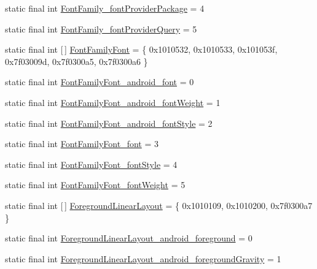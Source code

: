 \begin{DoxyCompactItemize}
static final int \mbox{\hyperlink{classandroid_1_1support_1_1design_1_1_r_1_1styleable_a5e5338b1eec839ae92c950a037b00a0d}{Font\+Family\+\_\+font\+Provider\+Package}} = 4
\item 
static final int \mbox{\hyperlink{classandroid_1_1support_1_1design_1_1_r_1_1styleable_ae5bf61893247cd75d621dc7bb25fecb1}{Font\+Family\+\_\+font\+Provider\+Query}} = 5
\item 
static final int \mbox{[}$\,$\mbox{]} \mbox{\hyperlink{classandroid_1_1support_1_1design_1_1_r_1_1styleable_a09598df35098c4c5ad3068090156e241}{Font\+Family\+Font}} = \{ 0x1010532, 0x1010533, 0x101053f, 0x7f03009d, 0x7f0300a5, 0x7f0300a6 \}
\item 
static final int \mbox{\hyperlink{classandroid_1_1support_1_1design_1_1_r_1_1styleable_a12b49851bc003a871fad6d76aeb48f3c}{Font\+Family\+Font\+\_\+android\+\_\+font}} = 0
\item 
static final int \mbox{\hyperlink{classandroid_1_1support_1_1design_1_1_r_1_1styleable_ae55ca32f6280936882e9d2ec17e3de81}{Font\+Family\+Font\+\_\+android\+\_\+font\+Weight}} = 1
\item 
static final int \mbox{\hyperlink{classandroid_1_1support_1_1design_1_1_r_1_1styleable_a86235e22018b12b83b0bd7f78c211890}{Font\+Family\+Font\+\_\+android\+\_\+font\+Style}} = 2
\item 
static final int \mbox{\hyperlink{classandroid_1_1support_1_1design_1_1_r_1_1styleable_ab911c016f3afffc49bc4c7c145287d3c}{Font\+Family\+Font\+\_\+font}} = 3
\item 
static final int \mbox{\hyperlink{classandroid_1_1support_1_1design_1_1_r_1_1styleable_a635ace782af7a8d713d5954f5075b7ac}{Font\+Family\+Font\+\_\+font\+Style}} = 4
\item 
static final int \mbox{\hyperlink{classandroid_1_1support_1_1design_1_1_r_1_1styleable_a045975bab557da3700497d30821aac08}{Font\+Family\+Font\+\_\+font\+Weight}} = 5
\item 
static final int \mbox{[}$\,$\mbox{]} \mbox{\hyperlink{classandroid_1_1support_1_1design_1_1_r_1_1styleable_a423286315758e65de84a49f81984f19a}{Foreground\+Linear\+Layout}} = \{ 0x1010109, 0x1010200, 0x7f0300a7 \}
\item 
static final int \mbox{\hyperlink{classandroid_1_1support_1_1design_1_1_r_1_1styleable_affe83e52e282d73f28e9e8adee61607c}{Foreground\+Linear\+Layout\+\_\+android\+\_\+foreground}} = 0
\item 
static final int \mbox{\hyperlink{classandroid_1_1support_1_1design_1_1_r_1_1styleable_a4dba2129ba63c29dc9680f2b57392af7}{Foreground\+Linear\+Layout\+\_\+android\+\_\+foreground\+Gravity}} = 1

\end{DoxyCompactItemize}
